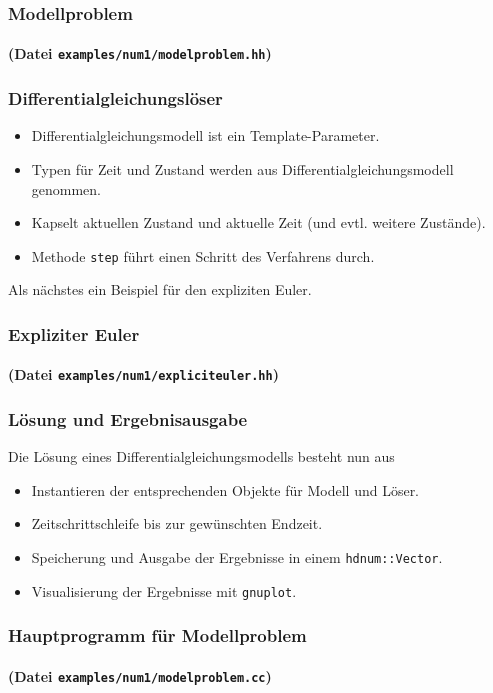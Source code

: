 \begin{frame}
\frametitle{Modellproblem}
\framesubtitle{(Datei \texttt{examples/num1/modelproblem.hh})}

\end{frame}

\begin{frame}[fragile]
\frametitle{Differentialgleichungslöser}
\begin{itemize}
\item Differentialgleichungsmodell ist ein Template-Parameter.
\item Typen für Zeit und Zustand werden aus Differentialgleichungsmodell genommen.
\item Kapselt aktuellen Zustand und aktuelle Zeit (und evtl. weitere Zustände).
\item Methode \lstinline{step} führt einen Schritt des Verfahrens durch.
\end{itemize}
Als nächstes ein Beispiel für den expliziten Euler.
\end{frame}

\begin{frame}
\frametitle{Expliziter Euler}
\framesubtitle{(Datei \texttt{examples/num1/expliciteuler.hh})}

\end{frame}

\begin{frame}[fragile]
\frametitle{Lösung und Ergebnisausgabe}
Die Lösung eines Differentialgleichungsmodells besteht nun aus
\begin{itemize}
\item Instantieren der entsprechenden Objekte für Modell und Löser.
\item Zeitschrittschleife bis zur gewünschten Endzeit.
\item Speicherung und Ausgabe der Ergebnisse in einem \lstinline{hdnum::Vector}.
\item Visualisierung der Ergebnisse mit \lstinline{gnuplot}.
\end{itemize}
\end{frame}

\begin{frame}
\frametitle{Hauptprogramm für Modellproblem}
\framesubtitle{(Datei \texttt{examples/num1/modelproblem.cc})}

\end{frame}
